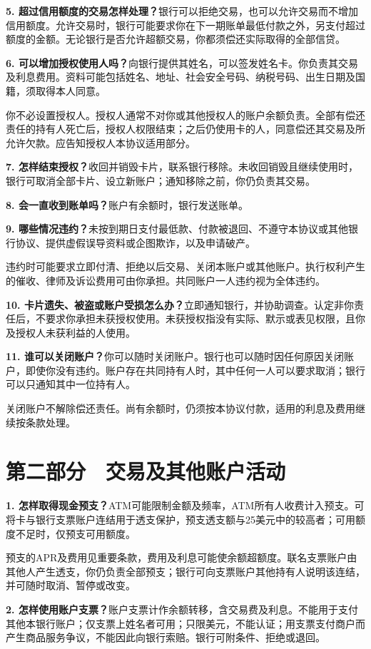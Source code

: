 \documentclass[UTF8,fontset=none,11pt,a4paper]{ctexart}
\begin{document}
\textbf{5. 超过信用额度的交易怎样处理？}银行可以拒绝交易，也可以允许交易而不增加信用额度。允许交易时，银行可能要求你在下一期账单最低付款之外，另支付超过额度的金额。无论银行是否允许超额交易，你都须偿还实际取得的全部信贷。


\textbf{6. 可以增加授权使用人吗？}向银行提供其姓名，可以签发姓名卡。你负责其交易及利息费用。资料可能包括姓名、地址、社会安全号码、纳税号码、出生日期及国籍，须取得本人同意。


你不必设置授权人。授权人通常不对你或其他授权人的账户余额负责。全部有偿还责任的持有人死亡后，授权人权限结束；之后仍使用卡的人，同意偿还其交易及所允许欠款。应告知授权人本协议适用部分。


\textbf{7. 怎样结束授权？}收回并销毁卡片，联系银行移除。未收回销毁且继续使用时，银行可取消全部卡片、设立新账户；通知移除之前，你仍负责其交易。


\textbf{8. 会一直收到账单吗？}账户有余额时，银行发送账单。


\textbf{9. 哪些情况违约？}未按到期日支付最低款、付款被退回、不遵守本协议或其他银行协议、提供虚假误导资料或企图欺诈，以及申请破产。


违约时可能要求立即付清、拒绝以后交易、关闭本账户或其他账户。执行权利产生的催收、律师及诉讼费用可由你承担。共同账户一人违约视为全体违约。


\textbf{10. 卡片遗失、被盗或账户受损怎么办？}立即通知银行，并协助调查。认定非你责任后，不要求你承担未获授权使用。未获授权指没有实际、默示或表见权限，且你及授权人未获利益的人使用。


\textbf{11. 谁可以关闭账户？}你可以随时关闭账户。银行也可以随时因任何原因关闭账户，即使你没有违约。账户存在共同持有人时，其中任何一人可以要求取消；银行可以只通知其中一位持有人。


关闭账户不解除偿还责任。尚有余额时，仍须按本协议付款，适用的利息及费用继续按条款处理。


\section*{第二部分　交易及其他账户活动}
\textbf{1. 怎样取得现金预支？}ATM可能限制金额及频率，ATM所有人收费计入预支。可将卡与银行支票账户连结用于透支保护，预支透支额与25美元中的较高者；可用额度不足时，仅预支可用额度。


预支的APR及费用见重要条款，费用及利息可能使余额超额度。联名支票账户由其他人产生透支，你仍负责全部预支；银行可向支票账户其他持有人说明该连结，并可随时取消、暂停或改变。


\textbf{2. 怎样使用账户支票？}账户支票计作余额转移，含交易费及利息。不能用于支付其他本银行账户；仅支票上姓名者可用；只限美元，不能认证；用支票支付商户而产生商品服务争议，不能因此向银行索赔。银行可附条件、拒绝或退回。
\end{document}
